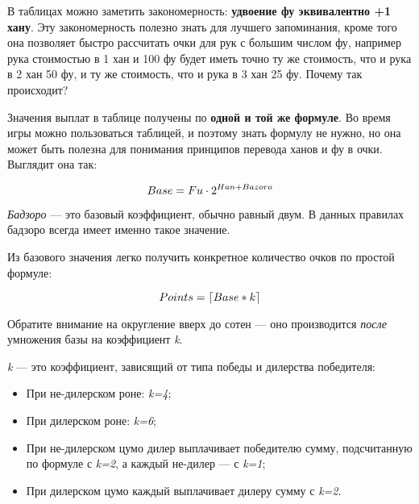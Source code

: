 \begin{additional}
	
В таблицах можно заметить закономерность: \textbf{удвоение фу эквивалентно +1 хану}. Эту закономерность полезно знать для лучшего запоминания, кроме того она позволяет быстро рассчитать очки для рук с большим числом фу, например рука стоимостью в 1 хан и 100 фу будет иметь точно ту же стоимость, что и рука в 2 хан 50 фу, и ту же стоимость, что и рука в 3 хан 25 фу. Почему так происходит? 

Значения выплат в таблице получены по \textbf{одной и той же формуле}. Во время игры можно пользоваться таблицей, и поэтому знать формулу не нужно, но она может быть полезна для понимания принципов перевода ханов и фу в очки. Выглядит она так:

\begin{equation}
	\large
	Base = Fu \cdot 2 ^ {Han + Bazoro}
\end{equation}

\textit{Бадзоро} --- это базовый коэффициент, обычно равный двум. В данных правилах бадзоро всегда имеет именно такое значение.

Из базового значения легко получить конкретное количество очков по простой формуле:

\begin{equation}
	\large
	Points = \lceil Base * k \rceil
\end{equation}

Обратите внимание на округление вверх до сотен --- оно производится \textit{после} умножения базы на коэффициент \textit{k}. 

\textit{k} --- это коэффициент, зависящий от типа победы и дилерства победителя:
\begin{itemize}
	\item При не-дилерском роне: \textit{k=4};
	\item При дилерском роне: \textit{k=6};
	\item При не-дилерском цумо дилер выплачивает победителю сумму, подсчитанную по формуле с \textit{k=2}, а каждый не-дилер --- с \textit{k=1};
	\item При дилерском цумо каждый выплачивает дилеру сумму с \textit{k=2}.
\end{itemize}


\end{additional}
